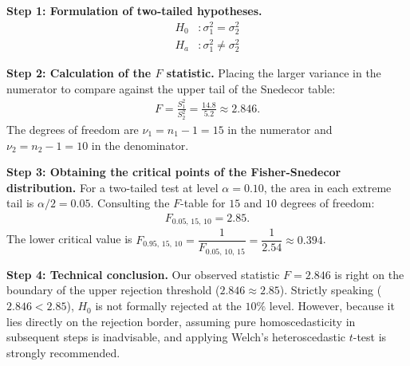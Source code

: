 \begin{solproblema}
	\textbf{Step 1: Formulation of two-tailed hypotheses.}
	\begin{align}
		H_0&: \sigma_1^2 = \sigma_2^2 \\
		H_a&: \sigma_1^2 \neq \sigma_2^2
	\end{align}
	
	\textbf{Step 2: Calculation of the $F$ statistic.}
	Placing the larger variance in the numerator to compare against the upper tail of the Snedecor table:
	\begin{align}
		F = \frac{S_1^2}{S_2^2} = \frac{14.8}{5.2} \approx 2.846.
	\end{align}
	The degrees of freedom are $\nu_1 = n_1 - 1 = 15$ in the numerator and $\nu_2 = n_2 - 1 = 10$ in the denominator.
	
	\textbf{Step 3: Obtaining the critical points of the Fisher-Snedecor distribution.}
	For a two-tailed test at level $\alpha = 0.10$, the area in each extreme tail is $\alpha/2 = 0.05$. Consulting the $F$-table for $15$ and $10$ degrees of freedom:
	\begin{align}
		F_{0.05, \, 15, \, 10} = 2.85.
	\end{align}
	The lower critical value is $F_{0.95, \, 15, \, 10} = \dfrac{1}{F_{0.05, \, 10, \, 15}} = \dfrac{1}{2.54} \approx 0.394$.
	
	\textbf{Step 4: Technical conclusion.}
	Our observed statistic $F = 2.846$ is right on the boundary of the upper rejection threshold ($2.846 \approx 2.85$). Strictly speaking ($2.846 < 2.85$), $H_0$ is not formally rejected at the $10\%$ level. However, because it lies directly on the rejection border, assuming pure homoscedasticity in subsequent steps is inadvisable, and applying Welch's heteroscedastic $t$-test is strongly recommended.
\end{solproblema}

